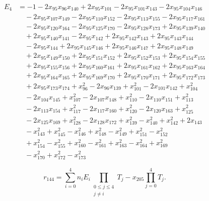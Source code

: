 \begin{align*}
E_{4}&=-1-2x_{95}x_{96}x_{140}+2x_{95}x_{101}-2x_{95}x_{101}x_{143}-2x_{95}x_{104}x_{146}\\
&\quad -2x_{95}x_{107}x_{149}-2x_{95}x_{110}x_{152}-2x_{95}x_{113}x_{155}-2x_{95}x_{117}x_{161}\\
&\quad -2x_{95}x_{120}x_{164}-2x_{95}x_{125}x_{170}-2x_{95}x_{128}x_{173}+2x_{95}x_{139}x_{140}\\
&\quad +2x_{95}x_{140}x_{141}-2x_{95}x_{142}+2x_{95}x_{142}x_{143}+2x_{95}x_{143}x_{144}\\
&\quad -2x_{95}x_{144}+2x_{95}x_{145}x_{146}+2x_{95}x_{146}x_{147}+2x_{95}x_{148}x_{149}\\
&\quad +2x_{95}x_{149}x_{150}+2x_{95}x_{151}x_{152}+2x_{95}x_{152}x_{153}+2x_{95}x_{154}x_{155}\\
&\quad +2x_{95}x_{155}x_{156}+2x_{95}x_{160}x_{161}+2x_{95}x_{161}x_{162}+2x_{95}x_{163}x_{164}\\
&\quad +2x_{95}x_{164}x_{165}+2x_{95}x_{169}x_{170}+2x_{95}x_{170}x_{171}+2x_{95}x_{172}x_{173}\\
&\quad +2x_{95}x_{173}x_{174}+x_{96}^{2}-2x_{96}x_{139}+x_{101}^{2}-2x_{101}x_{142}+x_{104}^{2}\\
&\quad -2x_{104}x_{145}+x_{107}^{2}-2x_{107}x_{148}+x_{110}^{2}-2x_{110}x_{151}+x_{113}^{2}\\
&\quad -2x_{113}x_{154}+x_{117}^{2}-2x_{117}x_{160}+x_{120}^{2}-2x_{120}x_{163}+x_{125}^{2}\\
&\quad -2x_{125}x_{169}+x_{128}^{2}-2x_{128}x_{172}+x_{139}^{2}-x_{140}^{2}+x_{142}^{2}+2x_{143}\\
&\quad -x_{143}^{2}+x_{145}^{2}-x_{146}^{2}+x_{148}^{2}-x_{149}^{2}+x_{151}^{2}-x_{152}^{2}\\
&\quad +x_{154}^{2}-x_{155}^{2}+x_{160}^{2}-x_{161}^{2}+x_{163}^{2}-x_{164}^{2}+x_{169}^{2}\\
&\quad -x_{170}^{2}+x_{172}^{2}-x_{173}^{2}
\end{align*}

\[
r_{144}=\sum_{i=0}^{4} n_i E_i\prod_{\substack{0\leq j\leq4\\j\ne i}}T_j
-x_{205}\prod_{j=0}^{4}T_j.
\]
